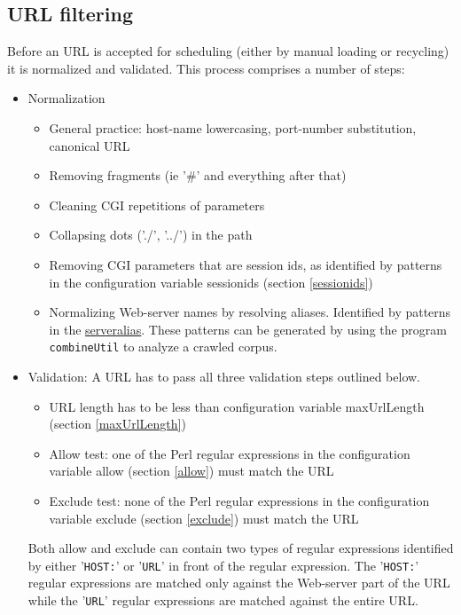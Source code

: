 \subsection{URL filtering}
\label{urlfilt}
Before an URL is accepted for scheduling (either by manual loading or
recycling) it is normalized and validated. This process comprises a
number of steps:
\begin{itemize}
\item Normalization
\begin{itemize}
\item General practice: host-name lowercasing, port-number
substitution, canonical URL

\item Removing fragments (ie '\#' and everything after that)

\item Cleaning CGI repetitions of parameters

\item Collapsing dots ('./', '../') in the path

\item Removing CGI parameters that are session ids, as identified by
patterns in the configuration variable sessionids (section \ref{sessionids})

\item Normalizing Web-server names by resolving aliases. Identified by
patterns in the \hyperref{configuration variable serveralias}{configuration variable serveralias (section }{)}{serveralias}.
These patterns can be generated by using the program
{\tt combineUtil} to analyze a crawled corpus.
\end{itemize}

\item Validation: A URL has to pass all three validation steps
outlined below.
\begin{itemize}
\item URL length has to be less than configuration variable
maxUrlLength (section \ref{maxUrlLength})

\item Allow test: one of the Perl regular expressions in the
configuration variable
allow (section \ref{allow}) must match the URL

\item Exclude test: none of the Perl regular expressions in the
configuration variable
 exclude (section \ref{exclude}) must match the URL

\end{itemize}
Both allow and exclude can contain two types of regular expressions
identified by either '{\tt HOST:}' or '{\tt URL}' in front of the
regular expression. The '{\tt HOST:}' regular expressions are matched only against the
Web-server part of the URL while the '{\tt URL}' regular expressions
are matched against the entire URL.
\end{itemize}

